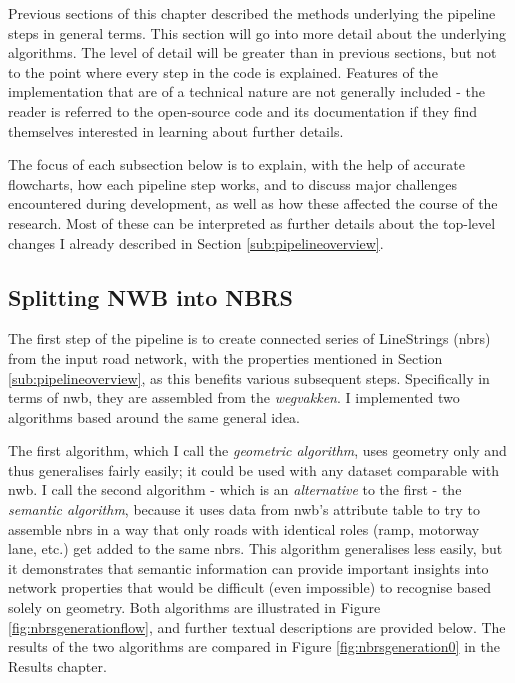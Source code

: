 Previous sections of this chapter described the methods underlying the pipeline steps in general terms. This section will go into more detail about the underlying algorithms. The level of detail will be greater than in previous sections, but not to the point where every step in the code is explained. Features of the implementation that are of a technical nature are not generally included - the reader is referred to the open-source code and its documentation if they find themselves interested in learning about further details.

The focus of each subsection below is to explain, with the help of accurate flowcharts, how each pipeline step works, and to discuss major challenges encountered during development, as well as how these affected the course of the research. Most of these can be interpreted as further details about the top-level changes I already described in Section \ref{sub:pipelineoverview}.

\subsection{Splitting NWB into NBRS}
\label{sub:m_nbrsgeneration}

The first step of the pipeline is to create connected series of LineStrings (\ac{nbrs}) from the input road network, with the properties mentioned in Section \ref{sub:pipelineoverview}, as this benefits various subsequent steps. Specifically in terms of \ac{nwb}, they are assembled from the \textit{wegvakken}. I implemented two algorithms based around the same general idea.

The first algorithm, which I call the \textit{geometric algorithm}, uses geometry only and thus generalises fairly easily; it could be used with any dataset comparable with \ac{nwb}. I call the second algorithm - which is an \textit{alternative} to the first - the \textit{semantic algorithm}, because it uses data from \ac{nwb}'s attribute table to try to assemble \ac{nbrs} in a way that only roads with identical roles (ramp, motorway lane, etc.) get added to the same \ac{nbrs}. This algorithm generalises less easily, but it demonstrates that semantic information can provide important insights into network properties that would be difficult (even impossible) to recognise based solely on geometry. Both algorithms are illustrated in Figure \ref{fig:nbrsgenerationflow}, and further textual descriptions are provided below. The results of the two algorithms are compared in Figure \ref{fig:nbrsgeneration0} in the Results chapter.

